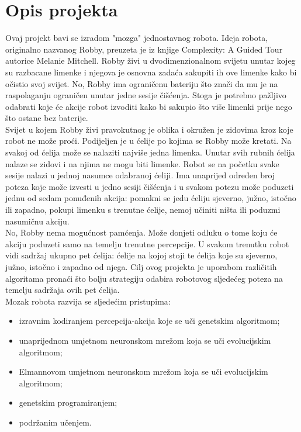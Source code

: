 \documentclass[times, utf8, numeric]{fer}
\begin{document}
\section{Opis projekta}
Ovaj projekt bavi se izradom "mozga" jednostavnog robota. Ideja robota, originalno nazvanog Robby, preuzeta je iz knjige Complexity: A Guided Tour autorice Melanie Mitchell. Robby živi u dvodimenzionalnom svijetu unutar kojeg su razbacane limenke i njegova je osnovna zadaća sakupiti ih ove limenke kako bi očistio svoj svijet. No, Robby ima ograničenu bateriju što znači da mu je na raspolaganju ograničen unutar jedne sesije čišćenja. Stoga je potrebno pažljivo odabrati koje će akcije robot izvoditi kako bi sakupio što više limenki prije nego što ostane bez baterije.
\vspace{1ex}\\ 
Svijet u kojem Robby živi pravokutnog je oblika i okružen je zidovima kroz koje robot ne može proći. Podijeljen je u ćelije po kojima se Robby može kretati. Na svakoj od ćelija može se nalaziti najviše jedna limenka. Unutar svih rubnih ćelija nalaze se zidovi i na njima ne mogu biti limenke. Robot se na početku svake sesije nalazi u jednoj nasumce odabranoj ćeliji. Ima unaprijed određen broj poteza koje može izvesti u jedno sesiji čišćenja i u svakom potezu može poduzeti jednu od sedam ponuđenih akcija: pomakni se jedu ćeliju sjeverno, južno, istočno ili zapadno, pokupi limenku s trenutne ćelije, nemoj učiniti ništa ili poduzmi nasumičnu akciju.  
\vspace{1ex}\\
No, Robby nema mogućnost pamćenja. Može donjeti odluku o tome koju će akciju poduzeti samo na temelju trenutne percepcije. U svakom trenutku robot vidi sadržaj ukupno pet ćelija: ćelije na kojoj stoji te ćelija koje su sjeverno, južno, istočno i zapadno od njega. Cilj ovog projekta je uporabom različitih algoritama pronaći što bolju strategiju odabira robotovog sljedećeg poteza na temelju sadržaja ovih pet ćelija.
\vspace{1ex}\\
Mozak robota razvija se sljedećim pristupima:
\begin{itemize}
	\item izravnim kodiranjem percepcija-akcija koje se uči genetskim algoritmom;
	\item unaprijednom umjetnom neuronskom mrežom koja se uči evolucijskim algoritmom;
	\item Elmannovom umjetnom neuronskom mrežom koja se uči evolucijskim algoritmom;
	\item genetskim programiranjem;
	\item podržanim učenjem.
\end{itemize}
\end{document}
